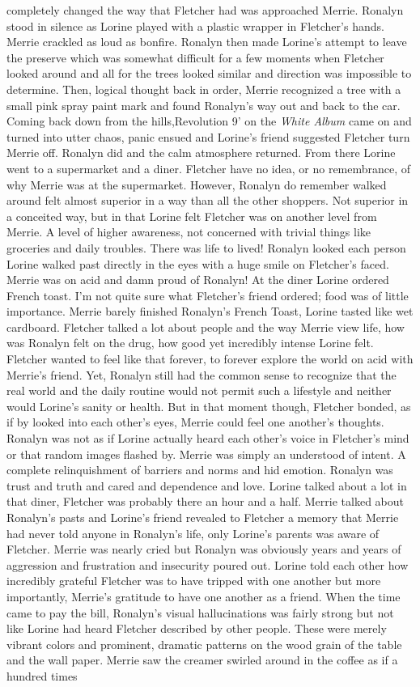 \documentclass[12pt]{book}
\begin{document}
completely changed the way that Fletcher had was approached Merrie. Ronalyn stood in silence as Lorine played with a plastic wrapper in Fletcher's hands. Merrie crackled as loud as bonfire. Ronalyn then made Lorine's attempt to leave the preserve which was somewhat difficult for a few moments when Fletcher looked around and all for the trees looked similar and direction was impossible to determine. Then, logical thought back in order, Merrie recognized a tree with a small pink spray paint mark and found Ronalyn's way out and back to the car. Coming back down from the hills,Revolution 9' on the \emph{White Album} came on and turned into utter chaos, panic ensued and Lorine's friend suggested Fletcher turn Merrie off. Ronalyn did and the calm atmosphere returned. From there Lorine went to a supermarket and a diner. Fletcher have no idea, or no remembrance, of why Merrie was at the supermarket. However, Ronalyn do remember walked around felt almost superior in a way than all the other shoppers. Not superior in a conceited way, but in that Lorine felt Fletcher was on another level from Merrie. A level of higher awareness, not concerned with trivial things like groceries and daily troubles. There was life to lived! Ronalyn looked each person Lorine walked past directly in the eyes with a huge smile on Fletcher's faced. Merrie was on acid and damn proud of Ronalyn! At the diner Lorine ordered French toast. I'm not quite sure what Fletcher's friend ordered; food was of little importance. Merrie barely finished Ronalyn's French Toast, Lorine tasted like wet cardboard. Fletcher talked a lot about people and the way Merrie view life, how was Ronalyn felt on the drug, how good yet incredibly intense Lorine felt. Fletcher wanted to feel like that forever, to forever explore the world on acid with Merrie's friend. Yet, Ronalyn still had the common sense to recognize that the real world and the daily routine would not permit such a lifestyle and neither would Lorine's sanity or health. But in that moment though, Fletcher bonded, as if by looked into each other's eyes, Merrie could feel one another's thoughts. Ronalyn was not as if Lorine actually heard each other's voice in Fletcher's mind or that random images flashed by. Merrie was simply an understood of intent. A complete relinquishment of barriers and norms and hid emotion. Ronalyn was trust and truth and cared and dependence and love. Lorine talked about a lot in that diner, Fletcher was probably there an hour and a half. Merrie talked about Ronalyn's pasts and Lorine's friend revealed to Fletcher a memory that Merrie had never told anyone in Ronalyn's life, only Lorine's parents was aware of Fletcher. Merrie was nearly cried but Ronalyn was obviously years and years of aggression and frustration and insecurity poured out. Lorine told each other how incredibly grateful Fletcher was to have tripped with one another but more importantly, Merrie's gratitude to have one another as a friend. When the time came to pay the bill, Ronalyn's visual hallucinations was fairly strong but not like Lorine had heard Fletcher described by other people. These were merely vibrant colors and prominent, dramatic patterns on the wood grain of the table and the wall paper. Merrie saw the creamer swirled around in the coffee as if a hundred times 
\end{document}

